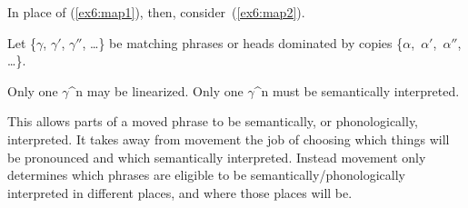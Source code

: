 In place of (\ref{ex6:map1}), then, consider~(\ref{ex6:map2}).%
%
%
%
\begin{exe}
\raggedright
	\ex \label{ex6:map2}
	Let \{$\gamma$, $\gamma '$, $\gamma ''$, \ldots\} be matching phrases or heads dominated by copies \{$\alpha$,~$\alpha '$,~$\alpha ''$, \ldots\}.
	\begin{xlist}
		\ex Only one $\gamma$^n may be linearized.
		\ex Only one $\gamma$^n must be semantically interpreted.
	\end{xlist}
\end{exe}
This allows parts of a moved phrase to be semantically, or phonologically, interpreted. It takes away from movement the job of choosing which things will be pronounced and which semantically interpreted. Instead movement only determines which phrases are eligible to be semantically/phonologically interpreted in different places, and where those places will be. 


